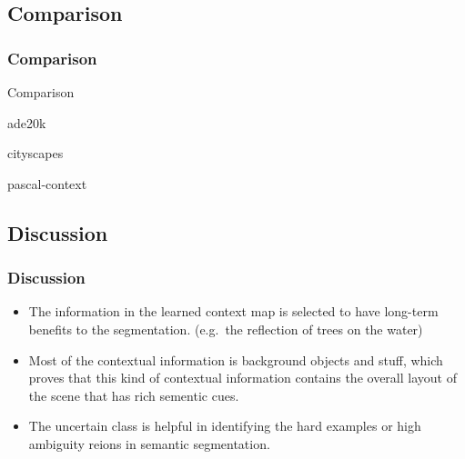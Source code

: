 \documentclass[12pt, aspectratio = 169, xcolor = x11names]{beamer}
\begin{document}
\subsection{Comparison}%
\label{sub:comparison}

\begin{frame}
  \frametitle{Comparison}
  \begin{table}[htbp]
    \centering
    \caption{Comparison}%
    \label{tab:comparison}
    \begin{subtable}[htbp]{0.32\linewidth}
      \centering
      \caption{ade20k}%
      \label{tab:ade20k}
      \tiny
      \setlength\tabcolsep{1pt}
    \end{subtable}
    \begin{subtable}[htbp]{0.32\linewidth}
      \centering
      \caption{cityscapes}%
      \label{tab:cityscapes}
      \tiny
      \setlength\tabcolsep{1pt}
    \end{subtable}
    \begin{subtable}[htbp]{0.32\linewidth}
      \centering
      \caption{pascal-context}%
      \label{tab:pascal-context}
      \tiny
      \setlength\tabcolsep{1pt}
    \end{subtable}
  \end{table}
\end{frame}

\subsection{Discussion}%
\label{sub:discussion}

\begin{frame}
  \frametitle{Discussion}
  \begin{itemize}[<+->]
    \item The information in the learned context map is selected to have
      long-term benefits to the segmentation. (e.g.\ the reflection of trees
      on the water)
    \item Most of the contextual information is background objects and stuff,
      which proves that this kind of contextual information contains the
      overall layout of the scene that has rich sementic cues.
    \item The uncertain class is helpful in identifying the hard examples or
      high ambiguity reions in semantic segmentation.
  \end{itemize}
\end{frame}
\end{document}
